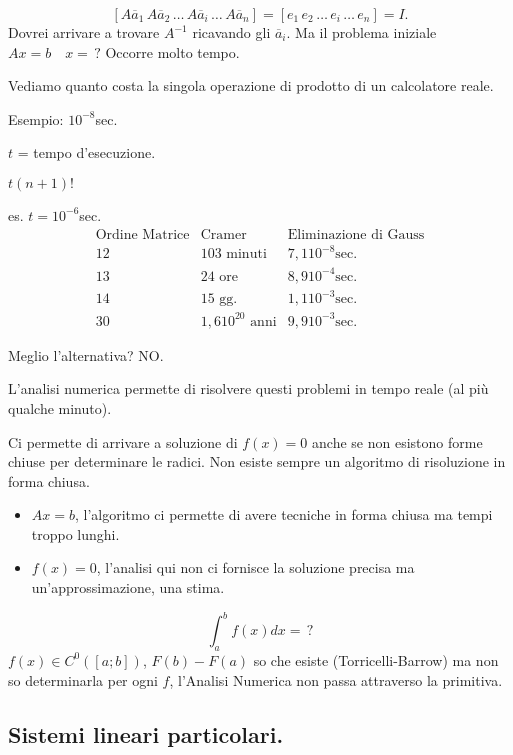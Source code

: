 \[[A\overline{a}_1\, A\overline{a}_2\, \ldots\, A\overline{a}_i\, \ldots\,
A\overline{a}_n] = [e_1\, e_2\, \ldots\, e_i\, \ldots\, e_n] = I.\]
Dovrei arrivare a trovare $A^{-1}$ ricavando gli $\overline{a}_i$.
\newline Ma il problema iniziale $Ax = b\quad  x = \, ?$
Occorre molto tempo.

Vediamo quanto costa la singola operazione di prodotto di un calcolatore
reale.

Esempio: $10^{-8}$sec.

$t$ = tempo d'esecuzione.

$t(n+1)!$

es. $t = 10^{-6}$sec.
\begin{displaymath}
\begin{array}{c|c|c}
\textrm{Ordine Matrice} & \textrm{Cramer} & \textrm{Eliminazione di Gauss} \\
\hline
12 & 103 \textrm{ minuti} & 7,1 10^{-8} \textrm{sec.} \\
13 & 24 \textrm{ ore} & 8,9 10^{-4} \textrm{sec.} \\
14 & 15 \textrm{ gg.} & 1,1 10^{-3} \textrm{sec.} \\
30 & 1,6 10^{20}\textrm{ anni} & 9,9 10^{-3} \textrm{sec.}
\end{array}
\end{displaymath}

Meglio l'alternativa? NO.

L'analisi numerica permette di risolvere questi problemi in tempo reale
(al più qualche minuto).

Ci permette di  arrivare a soluzione di $f(x) = 0$ anche se non esistono
forme chiuse per determinare le radici. Non esiste sempre un algoritmo di
risoluzione in forma chiusa.
\begin{itemize}
\item $Ax = b$, l'algoritmo ci permette di avere tecniche in forma chiusa ma
tempi troppo lunghi.
\item $f(x) = 0$, l'analisi qui non ci fornisce la soluzione precisa ma
un'approssimazione, una stima.
\end{itemize}
\[
\int_a^bf(x)dx = \,?
\]
$f(x) \in C^0([a;b])$, $
F(b)- F(a)$ so che esiste (Torricelli-Barrow) ma non so determinarla per ogni
$f$,
l'Analisi Numerica non passa attraverso la primitiva.

\subsection{Sistemi lineari particolari.}

